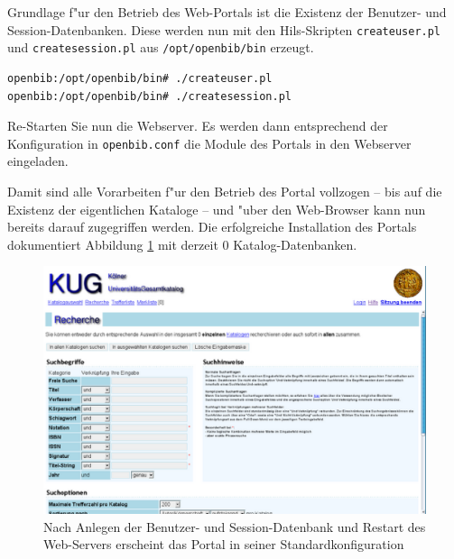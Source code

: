 \documentclass[11pt, twoside, a4paper, BCOR8mm, DIV12, bibtotoc,idxtotoc]{scrbook}
\begin{document}
Grundlage f"ur den Betrieb des Web-Portals ist die Existenz der
Benutzer- und Session-Datenbanken. Diese werden nun mit den
Hils-Skripten \texttt{createuser.pl} und \texttt{createsession.pl} aus
\texttt{/opt/openbib/bin} erzeugt.

\begin{verbatim}
openbib:/opt/openbib/bin# ./createuser.pl
openbib:/opt/openbib/bin# ./createsession.pl
\end{verbatim}

Re-Starten Sie nun die Webserver. Es werden dann entsprechend der
Konfiguration in \texttt{openbib.conf} die Module des Portals in den
Webserver eingeladen.

Damit sind alle Vorarbeiten f"ur den Betrieb des Portal vollzogen --
bis auf die Existenz der eigentlichen Kataloge -- und "uber den
Web-Browser kann nun bereits darauf zugegriffen werden. Die
erfolgreiche Installation des Portals dokumentiert Abbildung
\ref{bild:fertig} mit derzeit 0 Katalog-Datenbanken.

\begin{figure}
\begin{shadowenv}
  \vspace{4mm}
    \centering \begin{minipage}[b]{1.0\textwidth}
      \centering \includegraphics[width=14cm]{fertig1.eps}
    \end{minipage}
    \caption{Nach Anlegen der Benutzer- und Session-Datenbank und
      Restart des Web-Servers erscheint das Portal in seiner Standardkonfiguration}
  \label{bild:fertig}
  \vspace{3mm}
\end{shadowenv}
\end{figure}
\end{document}
